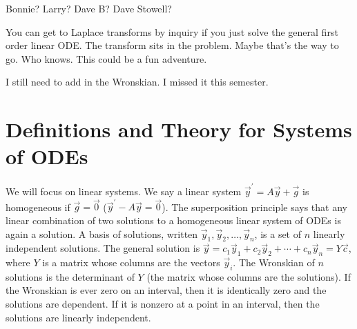 {Bonnie? Larry?  Dave B? Dave Stowell?

You can get to Laplace transforms by inquiry if you just solve the general first order linear ODE.  The transform sits in the problem.  Maybe that's the way to go.  Who knows.  This could be a fun adventure.


I still need to add in the Wronskian.  I missed it this semester.

\section{Definitions and Theory for Systems of ODEs}
We will focus on linear systems. We say a linear system $\vec y^\prime = A\vec y +\vec g$ is homogeneous if $\vec g =\vec 0$ ($\vec y^\prime -A\vec y =\vec 0$). The superposition principle says that any linear combination of two solutions to a homogeneous linear system of ODEs is again a solution.  A basis of solutions, written $\vec y_{1},\vec y_{2},\ldots, \vec y_{n}$, is a set of $n$ linearly independent solutions. The general solution is $\vec y = c_1\vec y_{1}+c_2\vec y_{2}+\cdots+c_n \vec y_{n} = Y\vec c$, where $Y$ is a matrix whose columns are the vectors $\vec y_{i}$.  The Wronskian of $n$ solutions is the determinant of $Y$ (the matrix whose columns are the solutions). If the Wronskian is ever zero on an interval, then it is identically zero and the solutions are dependent.  If it is nonzero at a point in an interval, then the solutions are linearly independent.

}